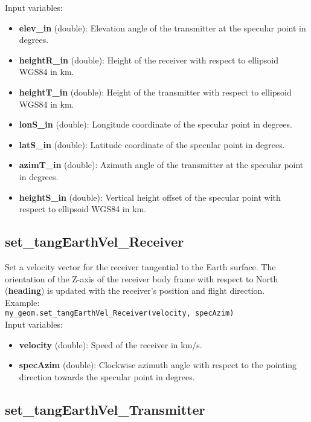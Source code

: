 Input variables:
\begin{itemize}
\item {\bf elev\_in} (double): Elevation angle of the transmitter at the specular point in degrees.
\item {\bf heightR\_in} (double): Height of the receiver with respect to ellipsoid WGS84 in km.
\item {\bf heightT\_in} (double): Height of the transmitter with respect to ellipsoid WGS84 in km.
\item {\bf lonS\_in} (double): Longitude coordinate of the specular point in degrees.
\item {\bf latS\_in} (double): Latitude coordinate of the specular point in degrees.
\item {\bf azimT\_in} (double): Azimuth angle of the transmitter at the specular point in degrees.
\item {\bf heightS\_in} (double): Vertical height offset of the specular point with respect to ellipsoid WGS84 in km.
\end{itemize}


\subsection{set\_tangEarthVel\_Receiver}

Set a velocity vector for the receiver tangential to the Earth surface. The orientation of the Z-axis of the receiver body frame with respect to North ({\bf heading}) is updated with the receiver's position and flight direction.\\

Example:\\

\texttt{my\_geom.set\_tangEarthVel\_Receiver(velocity, specAzim)}\\

Input variables:
\begin{itemize}
\item {\bf velocity} (double): Speed of the receiver in km/s.
\item {\bf specAzim} (double): Clockwise azimuth angle with respect to the pointing direction towards the specular point in degrees.
\end{itemize}


\subsection{set\_tangEarthVel\_Transmitter}


